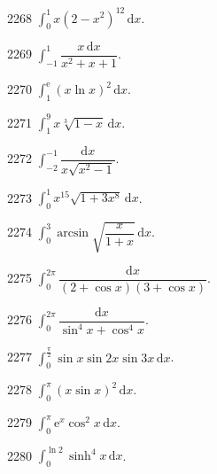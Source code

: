 \begin{prob}[S]{2268}
$\int_0^1 x(2-x^2)^{12}\,\mathrm{d}x$.
\end{prob}

\begin{prob}[S]{2269}
$\int_{-1}^1 \dfrac{x\,\mathrm{d}x}{x^2+x+1}$.
\end{prob}

\begin{prob}[S]{2270}
$\int_1^{\mathrm{e}} (x\ln x)^2\,\mathrm{d}x$.
\end{prob}

\begin{prob}[S]{2271}
$\int_1^9 x\sqrt[3]{1-x}\,\mathrm{d}x$.
\end{prob}

\begin{prob}[S]{2272}
$\int_{-2}^{-1} \dfrac{\mathrm{d}x}{x\sqrt{x^2-1}}$.
\end{prob}

\begin{prob}[S]{2273}
$\int_0^1 x^{15}\sqrt{1+3x^8}\,\mathrm{d}x$.
\end{prob}

\begin{prob}[S]{2274}
$\int_0^3 \arcsin \sqrt{\dfrac{x}{1+x}}\,\mathrm{d}x$.
\end{prob}

\begin{prob}[S]{2275}
$\int_0^{2\pi} \dfrac{\mathrm{d}x}{(2+\cos x)(3+\cos x)}$.
\end{prob}

\begin{prob}[S]{2276}
$\int_0^{2\pi} \dfrac{\mathrm{d}x}{\sin^4 x + \cos^4 x}$.
\end{prob}

\begin{prob}[S]{2277}
$\int_0^{\frac{\pi}{2}} \sin x \sin 2x \sin 3x\,\mathrm{d}x$.
\end{prob}

\begin{prob}[S]{2278}
$\int_0^\pi (x\sin x)^2\,\mathrm{d}x$.
\end{prob}

\begin{prob}[S]{2279}
$\int_0^\pi \mathrm{e}^x \cos^2 x\,\mathrm{d}x$.
\end{prob}

\begin{prob}[S]{2280}
$\int_0^{\ln 2} \sinh^4 x\,\mathrm{d}x$.
\end{prob}


